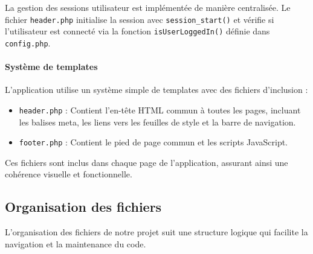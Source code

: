 \documentclass[a4paper,12pt]{article}
\begin{document}
La gestion des sessions utilisateur est implémentée de manière centralisée. Le fichier \texttt{header.php} initialise la session avec \texttt{session\_start()} et vérifie si l'utilisateur est connecté via la fonction \texttt{isUserLoggedIn()} définie dans \texttt{config.php}.

\vspace{0.5em}


\paragraph{Système de templates}
L'application utilise un système simple de templates avec des fichiers d'inclusion :
\begin{itemize}
  \item \texttt{header.php} : Contient l'en-tête HTML commun à toutes les pages, incluant les balises meta, les liens vers les feuilles de style et la barre de navigation.
  \item \texttt{footer.php} : Contient le pied de page commun et les scripts JavaScript.
\end{itemize}

Ces fichiers sont inclus dans chaque page de l'application, assurant ainsi une cohérence visuelle et fonctionnelle.

\subsection{Organisation des fichiers}
L'organisation des fichiers de notre projet suit une structure logique qui facilite la navigation et la maintenance du code.
\end{document}
